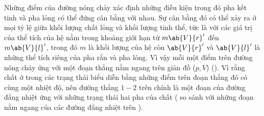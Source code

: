 Những điểm của đường nóng chảy xác định những điều kiện trong đó pha kết tinh và pha lỏng có thể đứng cân bằng với nhau. Sự cân bằng đó có thể xảy ra ở mọi tỷ lệ giữa khối lượng chất lỏng và khối lượng tinh thể, tức là với các giá trị của thể tích của hệ nằm trong khoảng giới hạn từ $m\ab{V}{r}'$ đến $m\ab{V}{l}'$, trong đó $m$ là khối lượng của hệ còn $\ab{V}{r}'$ và $\ab{V}{l}'$ là những thể tích riêng của pha rắn và pha lỏng. Vì vậy mỗi một điểm trên đường nóng chảy ứng với một đoạn thẳng nằm ngang trên giản đồ ($p,V$) (). Vì rằng chất ở trong các trạng thái biểu diễn bằng những điểm trên đoạn thẳng đó có cùng một nhiệt độ, nên đường thẳng $1-2$ trên  chính là một đoạn của đường đẳng nhiệt ứng với những trạng thái hai pha của chất ( so sánh với những đoạn nằm ngang của các đường đẳng nhiệt trên ).\\

